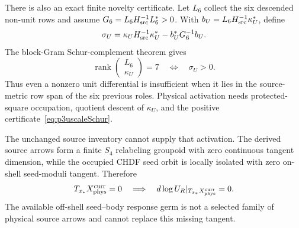 There is also an exact finite novelty certificate.  Let $L_6$ collect the six
descended non-unit rows and assume
$G_6=L_6H_{\rm src}^{-1}L_6^*>0$.  With
$b_U=L_6H_{\rm src}^{-1}\kappa_U^*$, define
\begin{equation}
 \sigma_U=\kappa_UH_{\rm src}^{-1}\kappa_U^*
 -b_U^*G_6^{-1}b_U.
 \label{eq:p3uscaleSchur}
\end{equation}
The block-Gram Schur-complement theorem gives
\begin{equation}
 \operatorname{rank}\!\begin{pmatrix}L_6\\ \kappa_U\end{pmatrix}=7
 \quad\Longleftrightarrow\quad \sigma_U>0.
 \label{eq:p3uscalerank}
\end{equation}
Thus even a nonzero unit differential is insufficient when it lies in the
source-metric row span of the six previous roles.  Physical activation needs
protected-square occupation, quotient descent of $\kappa_U$, and the positive
certificate~\eqref{eq:p3uscaleSchur}.

The unchanged source inventory cannot supply that activation.  The derived
source arrows form a finite $S_4$ relabeling groupoid with zero continuous
tangent dimension, while the occupied CHDF seed orbit is locally isolated
with zero on-shell seed-moduli tangent.  Therefore
\begin{equation}
 T_{x_*}X_{\rm phys}^{\rm curr}=0
 \quad\Longrightarrow\quad
 d\log U_R|_{T_{x_*}X_{\rm phys}^{\rm curr}}=0.
 \label{eq:p3currentsourcenogo}
\end{equation}
The available off-shell seed--body response germ is not a selected family of
physical source arrows and cannot replace this missing tangent.

